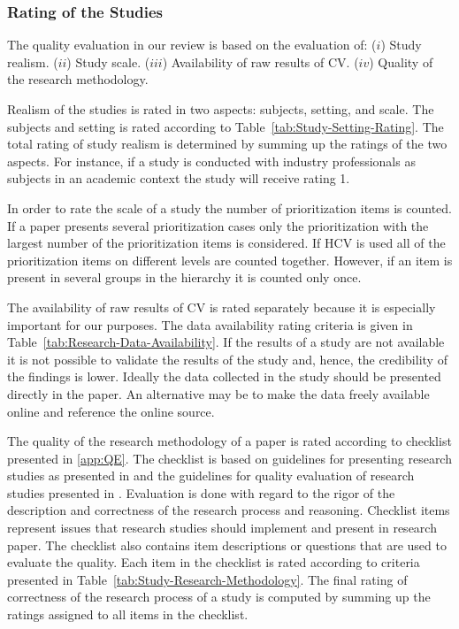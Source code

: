 \subsubsection{Rating of the Studies}

The quality evaluation in our review is based on the evaluation of: ($i$) Study realism. ($ii$) Study scale. ($iii$) Availability of raw results of CV. ($iv$) Quality of the research methodology.

Realism of the studies is rated in two aspects: subjects, setting, and scale.
The subjects and setting is rated according to Table~\ref{tab:Study-Setting-Rating}. The total rating of study realism is determined by summing up the ratings of the two aspects. For instance, if a study is conducted with industry professionals as subjects in an academic context the study will receive rating 1.

In order to rate the scale of a study the number of prioritization items is counted.
If a paper presents several prioritization cases only the prioritization with the largest number of the prioritization items is considered.
If HCV is used all of the prioritization items on different levels are counted together. However, if an item is present in several groups in the hierarchy it is counted only once.

The availability of raw results of CV is rated separately because it is especially important for our purposes. The data availability rating criteria is given in Table~\ref{tab:Research-Data-Availability}. If the results of a study are not available it is not possible to validate the results of the study and, hence, the credibility of the findings is lower. Ideally the data collected in the study should be presented directly in the paper. An alternative may be to make the data freely available online and reference the online source.

The quality of the research methodology of a paper is rated according to checklist presented in \ref{app:QE}. The checklist is based on guidelines for presenting research studies as presented in \citep{Wohlin2000,Jedlitschka2005} and the guidelines for quality evaluation of research studies presented in \citep{Ivarsson2010,Kitchenham2007}. Evaluation is done with regard to the rigor of the description and correctness of the research process and reasoning. Checklist items represent issues that research studies should implement and present in research paper. The checklist also contains item descriptions or questions that are used to evaluate the quality. Each item in the checklist is rated according to criteria presented in Table~\ref{tab:Study-Research-Methodology}. The final rating of correctness of the research process of a study is computed by summing up the ratings assigned to all items in the checklist.

